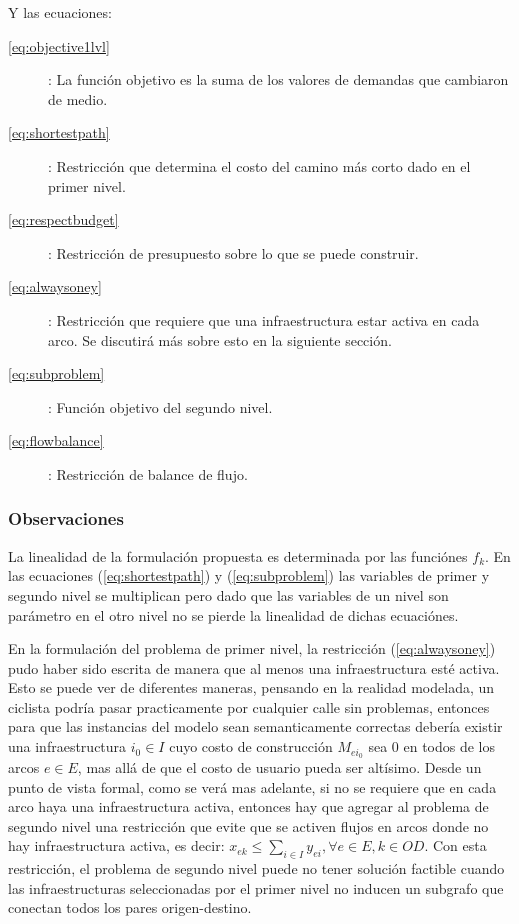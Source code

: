 \documentclass{article}
\begin{document}
  Y las ecuaciones:

  \begin{description}
    \item[\ref{eq:objective1lvl}]: La función objetivo es la suma de los valores de demandas que cambiaron de medio.
    \item[\ref{eq:shortestpath}]: Restricción que determina el costo del camino más corto dado en el primer nivel.
    \item[\ref{eq:respectbudget}]: Restricción de presupuesto sobre lo que se puede construir.
    \item[\ref{eq:alwaysoney}]: Restricción que requiere que una infraestructura estar activa en cada arco. Se discutirá más sobre esto en la siguiente sección.
    \item[\ref{eq:subproblem}]: Función objetivo del segundo nivel.
    \item[\ref{eq:flowbalance}]: Restricción de balance de flujo.
  \end{description}

  \subsubsection*{Observaciones}

  La linealidad de la formulación propuesta es determinada por las funciónes $f_k$. En las ecuaciones (\ref{eq:shortestpath}) y (\ref{eq:subproblem}) las variables de primer y segundo nivel se multiplican pero dado que las variables de un nivel son parámetro en el otro nivel no se pierde la linealidad de dichas ecuaciónes.

  En la formulación del problema de primer nivel, la restricción (\ref{eq:alwaysoney}) pudo haber sido escrita de manera que al menos una infraestructura esté activa. Esto se puede ver de diferentes maneras, pensando en la realidad modelada, un ciclista podría pasar practicamente por cualquier calle sin problemas, entonces para que las instancias del modelo sean semanticamente correctas debería existir una infraestructura $i_0 \in I$ cuyo costo de construcción $M_{ei_0}$ sea 0 en todos de los arcos $e \in E$, mas allá de que el costo de usuario pueda ser altísimo. Desde un punto de vista formal, como se verá mas adelante, si no se requiere que en cada arco haya una infraestructura activa, entonces hay que agregar al problema de segundo nivel una restricción que evite que se activen flujos en arcos donde no hay infraestructura activa, es decir: $x_{ek} \leq \sum_{i \in I} y_{ei}, \forall e \in E, k \in OD$. Con esta restricción, el problema de segundo nivel puede no tener solución factible cuando las infraestructuras seleccionadas por el primer nivel no inducen un subgrafo que conectan todos los pares origen-destino.
\end{document}

